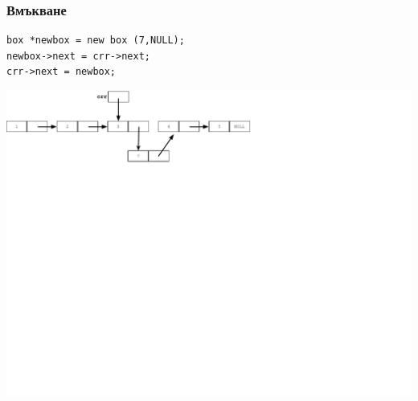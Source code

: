 \documentclass{beamer}
\begin{document}
\begin{frame}[fragile]
\frametitle{Вмъкване}

\begin{flushleft}
\begin{lstlisting}
box *newbox = new box (7,NULL);
newbox->next = crr->next;
crr->next = newbox;
\end{lstlisting}  
\end{flushleft}


\includegraphics[width=14.0cm]{images/05_ll_insert_secondlink}

\end{frame}
\end{document}

